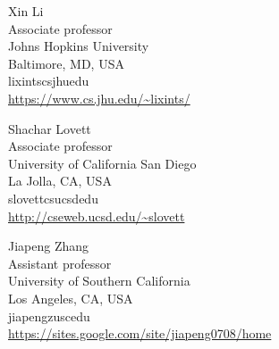 \documentclass{toc}
\begin{document}
\begin{tocauthors}
\begin{tocinfo}[Li]
 Xin Li\\
 Associate professor\\  
 Johns Hopkins University\\
 Baltimore, MD, USA\\
 lixints\tocat{}cs\tocdot{}jhu\tocdot{}edu \\
 \url{https://www.cs.jhu.edu/~lixints/}
\end{tocinfo}
\begin{tocinfo}[Lovett]
  Shachar Lovett\\
  Associate professor \\ 
  University of California San Diego\\
  La Jolla, CA, USA\\
  slovett\tocat{}cs\tocdot{}ucsd\tocdot{}edu \\
  \url{http://cseweb.ucsd.edu/~slovett}
\end{tocinfo}
\begin{tocinfo}[Zhang]
  Jiapeng Zhang\\
  Assistant professor \\ 
  University of Southern California\\
  Los Angeles, CA, USA\\
  jiapengz\tocat{}usc\tocdot{}edu \\
  \url{https://sites.google.com/site/jiapeng0708/home}
\end{tocinfo}
\end{tocauthors}
\end{document}
